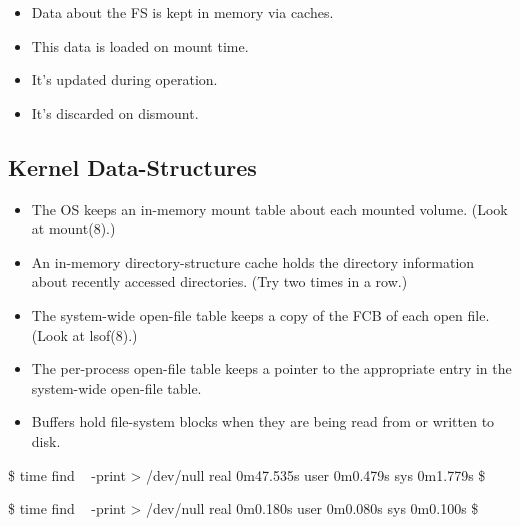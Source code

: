 \documentclass{beamer}
\begin{document}
\begin{frame}{\insertsubsectionhead}
  \begin{itemize}
    \item Data about the FS is kept in memory via caches.
    \item This data is loaded on mount time.
    \item It's updated during operation.
    \item It's discarded on dismount.
  \end{itemize}
\end{frame}

\subsection{Kernel Data-Structures}

\begin{frame}{\insertsubsectionhead}
  \begin{itemize}
    \item The OS keeps an in-memory mount table about each mounted volume.
      (Look at mount(8).)

    \item An in-memory directory-structure cache holds the directory 
      information about recently accessed directories.
      (Try  two times in 
      a row.)

    \item The system-wide open-file table keeps a copy of the FCB of each open 
      file.
      (Look at lsof(8).)

    \item The per-process open-file table keeps a pointer to the appropriate 
      entry in the system-wide open-file table.

    \item Buffers hold file-system blocks when they are being read from or 
      written to disk.

  \end{itemize}
\end{frame}

\begin{frame}[fragile]{\insertsubsectionhead}
  \begin{terminal}
\$ time find ~ -print > /dev/null
real    0m47.535s
user    0m0.479s
sys     0m1.779s
\$
  \end{terminal}
  \begin{terminal}
\$ time find ~ -print > /dev/null
real    0m0.180s
user    0m0.080s
sys     0m0.100s
\$
  \end{terminal}
\end{frame}
\end{document}

